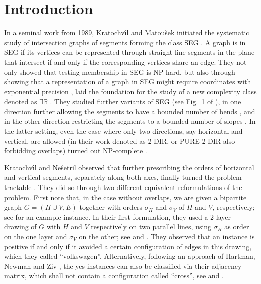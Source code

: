 \documentclass[runningheads]{llncs}
\begin{document}
\section{Introduction}
In a seminal work from 1989, Kratochv{\'\i}l and Matou{\v s}ek initiated the systematic study of intersection graphs of segments forming the class \textsc{SEG} \cite{km-igo-94}.
A graph is in \textsc{SEG} if its vertices can be represented through straight line segments in the plane that intersect if and only if the corresponding vertices share an edge.
They not only showed that testing membership in \textsc{SEG} is NP-hard, but also through showing that a representation of a graph in \textsc{SEG} might require coordinates with exponential precision \cite{km-igo-94}, laid the foundation for the study of a new complexity class denoted as $\exists\mathbb{R}$ \cite{sch-cos-10}.
They studied further variants of \textsc{SEG} (see Fig.~1 of \cite{km-igo-94}), in one direction further allowing the segments to have a bounded number of bends \cite{kra-sgi-91,km-nhr-89}, and in the other direction restricting the segments to a bounded number of slopes \cite{kra-asp-94}.
In the latter setting, even the case where only two directions, say horizontal and vertical, are allowed (in their work denoted as \textsc{2-DIR}, or \textsc{PURE-2-DIR} also forbidding overlaps) turned out NP-complete \cite{kra-asp-94}.

Kratochv{\'\i}l and Neŝetril observed that further prescribing the orders of horizontal and vertical segments, separately along both axes, finally turned the problem tractable \cite{kra-asp-94,nf-ppa-92}.
They did so through two different equivalent reformulations of the problem.
First note that, in the case without overlaps, we are given a bipartite graph $G=(H\cup V, E)$ together with orders $\sigma_H$ and $\sigma_V$ of $H$ and $V$, respectively; see  for an example instance.
In their first formulation, they used a 2-layer drawing of $G$ with $H$ and $V$ respectively on two parallel lines, using $\sigma_H$ as order on the one layer and $\sigma_V$ on the other; see  and \cite[Fig.~19]{kra-asp-94}.
They observed that an instance is positive if and only if it avoided a certain configuration of edges in this drawing, which they called ``volkswagen''.
Alternatively, following an approach of Hartman, Newman and Ziv \cite{hnz-ogi-91}, the yes-instances can also be classified via their adjacency matrix, which shall not contain a configuration called ``cross'', see  and \cite[Proposition 3.1]{hnz-ogi-91}.
\end{document}
